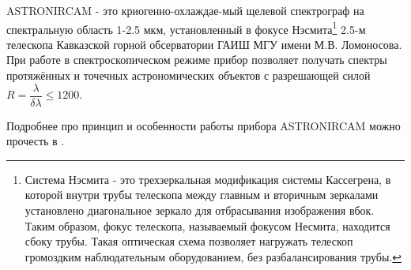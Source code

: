 \documentclass[a4paper]{article}
\begin{document}
ASTRONIRCAM - это криогенно-охлаждае-мый щелевой спектрограф на спектральную область 1-2.5 мкм, установленный в фокусе Нэсмита\footnote{Система Нэсмита - это трехзеркальная модификация системы Кассегрена, в которой внутри трубы телескопа между главным и вторичным зеркалами установлено диагональное зеркало для отбрасывания изображения вбок. Таким образом, фокус телескопа, называемый фокусом Несмита, находится сбоку трубы. Такая оптическая схема позволяет нагружать телескоп громоздким наблюдательным оборудованием, без разбалансирования трубы.} 2.5-м телескопа Кавказской горной обсерватории ГАИШ МГУ имени М.В. Ломоносова. При работе в спектроскопическом режиме прибор позволяет получать спектры протяжённых и точечных астрономических объектов с разрешающей силой $R = \dfrac{\lambda}{\delta\lambda}\leq 1200$.

Подробнее про принцип и особенности работы прибора ASTRONIRCAM можно прочесть в \cite{Sulsky1994}.

\hfill\break
\end{document}
